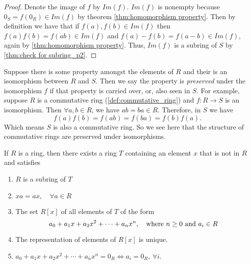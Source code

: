 \documentclass[../main.tex]{subfiles}
\begin{document}
\begin{proof}
Denote the image of $f$ by $Im(f)$. $Im(f)$ is nonempty because 
$0_S = f(0_R) \in Im(f)$ by theorem \ref{thm:homomorphism property}.
Then by definition we have that if $f(a), f(b) \in Im(f)$ then 
$f(a)f(b) = f(ab) \in Im(f)$ and $f(a) - f(b) = f(a-b) \in Im(f)$, again by \ref{thm:homomorphism property}. Thus, $Im(f)$ is a subring of $S$ by \ref{thm:check for subring_p2}.

\end{proof}

\begin{remark}
Suppose there is some property amongst the elements of $R$ and their is 
an isomorphism between $R$ and $S$. Then we say the property is \textit{preserved}
under the isomorphism $f$ if that property is carried over, or, also seen in $S$.
For example, suppose $R$ is a commutative ring (\ref{def:commutative_ring}) and $f: R \to S$
is an isomorphism. Then $\forall a,b \in R$, we have $ab = ba \in R$. Therefore, in $S$ we have \[
f(a)f(b) = f(ab) = f(ba) = f(b)f(a).
\]
Which means $S$ is also a commutative ring. So we see here that the structure of commutative rings are preserved under isomorphisms.
\end{remark}



\begin{theorem}
If $R$ is a ring, then there exists a ring $T$ containing an element
$x$ that is not in $R$ and satisfies
\begin{enumerate}
    \item $R$ is a subring of $T$
    \item $xa = ax, \quad \forall a \in R$
    \item The set $R[x]$ of all elements of $T$ of the form \[
    a_0 + a_1x + a_2x^2 + \cdots + a_nx^n, \quad \textnormal{where } n \geq 0 \textnormal{ and } a_i \in R
    \]
    \item The representation of elements of $R[x]$ is unique.
    \item $a_0 + a_1x + a_2x^2 + \cdots + a_nx^n = 0_R \iff a_i = 0_R, \ \forall i$.
\end{enumerate}
\end{theorem}
\end{document}
